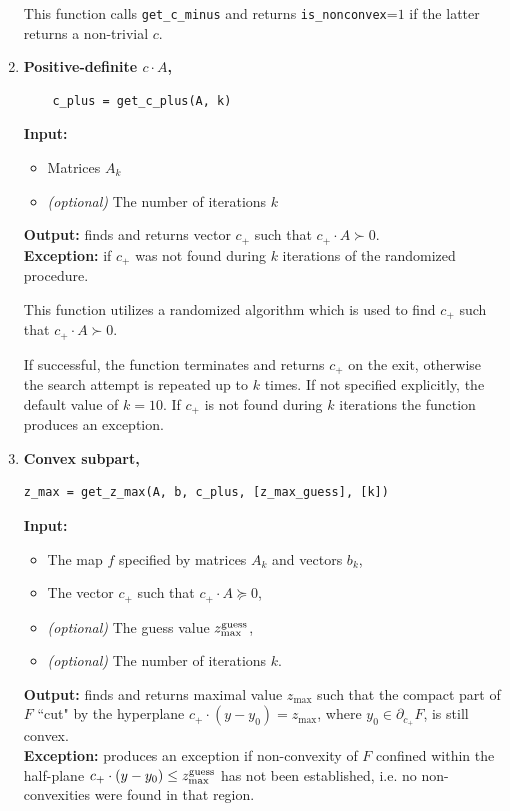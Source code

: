 \documentclass[a4paper]{article}
\theoremstyle{definition}
\begin{document}
\begin{enumerate}
	
This function calls {\tt get\_c\_minus} and returns  {\tt is\_nonconvex}=$1$ if the latter returns a non-trivial $c$. 


\item {\bf Positive-definite $c\cdot A$,\hskip 6pt}
\begin{verbatim}
	c_plus = get_c_plus(A, k)
\end{verbatim}

{\bf Input:}
\begin{itemize}
	\item Matrices $A_k$
	\item {\it (optional)} The number of iterations $k$
\end{itemize}
{\bf Output:} finds and returns vector $c_+$ such that $c_+\cdot A\succ 0$.\\
{\bf Exception:} if $c_+$  was not found during $k$ iterations of the randomized procedure.
	
This function utilizes a randomized algorithm which is used to find $c_+$ such that $c_+\cdot A\succ 0$.

If successful, the function terminates and returns $c_+$ on the exit, otherwise the search attempt is repeated up to $k$ times.
If not specified explicitly, the default value of $k=10$.
If $c_+$ is not found during $k$ iterations the function produces an exception. 

\newpage
	
\item {\bf Convex subpart,\hskip 6pt}
\begin{verbatim}
z_max = get_z_max(A, b, c_plus, [z_max_guess], [k])
\end{verbatim}
{\bf Input:}
\begin{itemize}
	\item The map $f$ specified by matrices $A_k$ and vectors $b_k$,
	\item The vector $c_+$ such that $c_+\cdot A\succeq 0$,
	\item {\it (optional)} The guess value  $z^{\rm guess}_{\rm max}$,
	\item {\it (optional)} The number of iterations $k$.
\end{itemize}
{\bf Output:} finds and returns maximal value $z_{\max}$ such that the compact part of $F$ ``cut" by the hyperplane  $c_+ \cdot (y-y_0)=z_{\max}$, where $y_0\in \partial_{c_+}F$, is still convex. \\
{\bf Exception:} produces an exception if non-convexity of $F$ confined within the half-plane $c_+ \cdot (y-y_0)\leq z^{\rm guess}_{\rm max}$  has not been established, i.e. no non-convexities were found in that region.


\end{enumerate}
\end{document}
